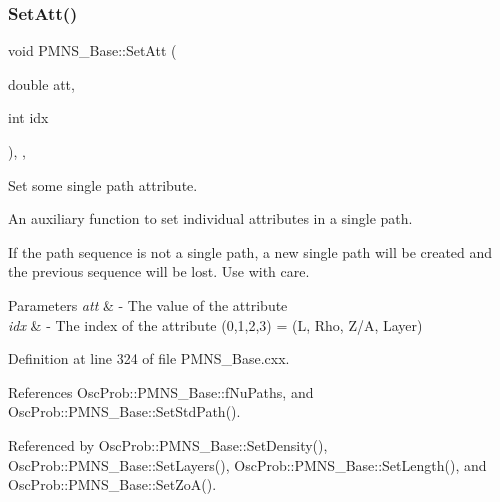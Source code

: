 \subsubsection{\texorpdfstring{Set\+Att()}{SetAtt()}\hspace{0.1cm}{\footnotesize\ttfamily [1/2]}}
{\footnotesize\ttfamily void P\+M\+N\+S\+\_\+\+Base\+::\+Set\+Att (\begin{DoxyParamCaption}\item[{double}]{att,  }\item[{int}]{idx }\end{DoxyParamCaption})\hspace{0.3cm}{\ttfamily [protected]}, {\ttfamily [virtual]}, {\ttfamily [inherited]}}

Set some single path attribute.

An auxiliary function to set individual attributes in a single path.

If the path sequence is not a single path, a new single path will be created and the previous sequence will be lost. Use with care.


\begin{DoxyParams}{Parameters}
{\em att} & -\/ The value of the attribute \\
\hline
{\em idx} & -\/ The index of the attribute (0,1,2,3) = (L, Rho, Z/A, Layer) \\
\hline
\end{DoxyParams}


Definition at line 324 of file P\+M\+N\+S\+\_\+\+Base.\+cxx.



References Osc\+Prob\+::\+P\+M\+N\+S\+\_\+\+Base\+::f\+Nu\+Paths, and Osc\+Prob\+::\+P\+M\+N\+S\+\_\+\+Base\+::\+Set\+Std\+Path().



Referenced by Osc\+Prob\+::\+P\+M\+N\+S\+\_\+\+Base\+::\+Set\+Density(), Osc\+Prob\+::\+P\+M\+N\+S\+\_\+\+Base\+::\+Set\+Layers(), Osc\+Prob\+::\+P\+M\+N\+S\+\_\+\+Base\+::\+Set\+Length(), and Osc\+Prob\+::\+P\+M\+N\+S\+\_\+\+Base\+::\+Set\+Zo\+A().


